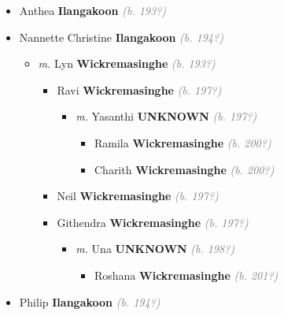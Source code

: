 \documentclass[10pt, openany]{book}
\begin{document}
\begin{itemize}
{\begin{itemize}
{\begin{itemize}
{\begin{itemize}
{ }
\item{Anthea \textbf{Ilangakoon} \textcolor{gray}{\textit{(b. 193?)}}
 }
\item{Nannette Christine \textbf{Ilangakoon} \textcolor{gray}{\textit{(b. 194?)}}
\begin{itemize}
\item{\textit{m.} Lyn \textbf{Wickremasinghe} \textcolor{gray}{\textit{(b. 193?)}}   \label{couple:00001380:00001381} \begin{itemize}
\item{Ravi \textbf{Wickremasinghe} \textcolor{gray}{\textit{(b. 197?)}}
\begin{itemize}
\item{\textit{m.} Yasanthi \textbf{UNKNOWN} \textcolor{gray}{\textit{(b. 197?)}}   \label{couple:00001385:00001386} \begin{itemize}
\item{Ramila \textbf{Wickremasinghe} \textcolor{gray}{\textit{(b. 200?)}}
 }
\item{Charith \textbf{Wickremasinghe} \textcolor{gray}{\textit{(b. 200?)}}
 }
\end{itemize}}
\end{itemize}
 }
\item{Neil \textbf{Wickremasinghe} \textcolor{gray}{\textit{(b. 197?)}}
 }
\item{Githendra \textbf{Wickremasinghe} \textcolor{gray}{\textit{(b. 197?)}}
\begin{itemize}
\item{\textit{m.} Una \textbf{UNKNOWN} \textcolor{gray}{\textit{(b. 198?)}}   \label{couple:00001382:00001383} \begin{itemize}
\item{Roshana \textbf{Wickremasinghe} \textcolor{gray}{\textit{(b. 201?)}}
 }
\end{itemize}}
\end{itemize}
 }
\end{itemize}}
\end{itemize}
  }
\item{Philip \textbf{Ilangakoon} \textcolor{gray}{\textit{(b. 194?)}}
 }
\end{itemize}}

\end{itemize}}
\end{itemize}}
\end{itemize}
\end{document}

